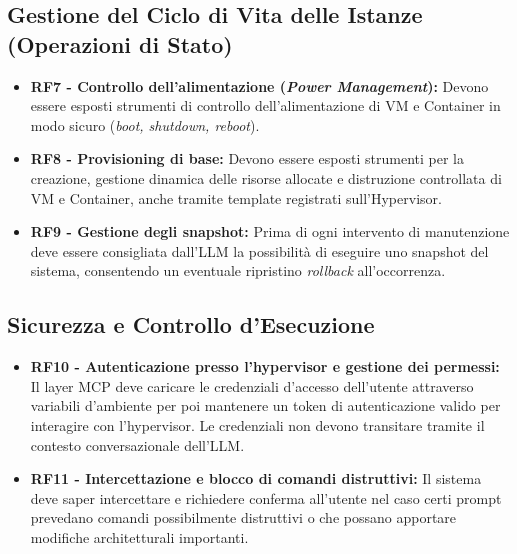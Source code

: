 \subsection{Gestione del Ciclo di Vita delle Istanze (Operazioni di Stato)}
\begin{itemize}
    \item \textbf{RF7 - Controllo dell'alimentazione (\textit{Power Management}):} Devono essere esposti strumenti di controllo dell'alimentazione di VM e Container in modo sicuro (\textit{boot, shutdown, reboot}).
    
    \item \textbf{RF8 - Provisioning di base:} Devono essere esposti strumenti per la creazione, gestione dinamica delle risorse allocate e distruzione controllata di VM e Container, anche tramite template registrati sull'Hypervisor.
    
    \item \textbf{RF9 - Gestione degli snapshot:} Prima di ogni intervento di manutenzione deve essere consigliata dall'LLM la possibilità di eseguire uno snapshot del sistema, consentendo un eventuale ripristino \textit{rollback} all'occorrenza.
\end{itemize}

\subsection{Sicurezza e Controllo d'Esecuzione}
\begin{itemize}
    \item \textbf{RF10 - Autenticazione presso l'hypervisor e gestione dei permessi:} Il layer MCP deve caricare le credenziali d'accesso dell'utente attraverso variabili d'ambiente per poi mantenere un token di autenticazione valido per interagire con l'hypervisor. Le credenziali non devono transitare tramite il contesto conversazionale dell'LLM.
    
    \item \textbf{RF11 - Intercettazione e blocco di comandi distruttivi:} Il sistema deve saper intercettare e richiedere conferma all'utente nel caso certi prompt prevedano comandi possibilmente distruttivi o che possano apportare modifiche architetturali importanti.
\end{itemize}

